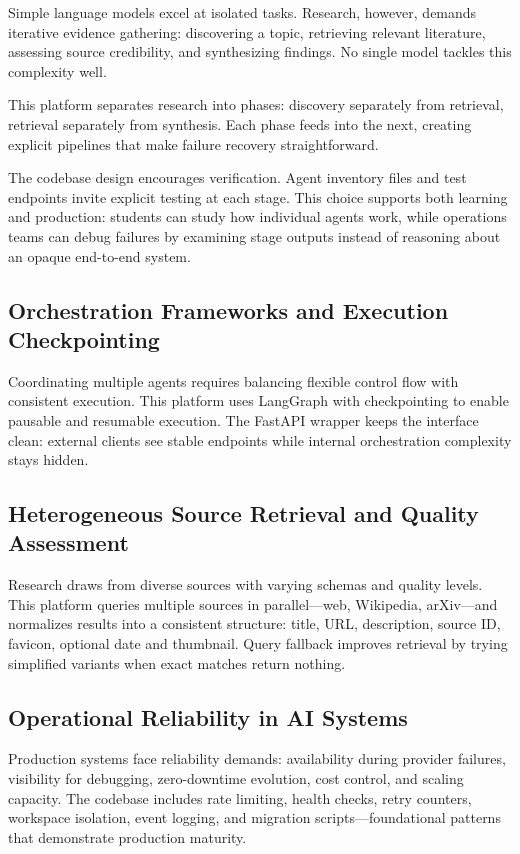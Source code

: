 \documentclass[12pt, a4paper]{article}
\begin{document}
Simple language models excel at isolated tasks. Research, however, demands iterative evidence gathering: discovering a topic, retrieving relevant literature, assessing source credibility, and synthesizing findings. No single model tackles this complexity well.

This platform separates research into phases: discovery separately from retrieval, retrieval separately from synthesis. Each phase feeds into the next, creating explicit pipelines that make failure recovery straightforward.

The codebase design encourages verification. Agent inventory files and test endpoints invite explicit testing at each stage. This choice supports both learning and production: students can study how individual agents work, while operations teams can debug failures by examining stage outputs instead of reasoning about an opaque end-to-end system.

\subsection{Orchestration Frameworks and Execution Checkpointing}

Coordinating multiple agents requires balancing flexible control flow with consistent execution. This platform uses LangGraph with checkpointing to enable pausable and resumable execution. The FastAPI wrapper keeps the interface clean: external clients see stable endpoints while internal orchestration complexity stays hidden.

\subsection{Heterogeneous Source Retrieval and Quality Assessment}

Research draws from diverse sources with varying schemas and quality levels. This platform queries multiple sources in parallel—web, Wikipedia, arXiv—and normalizes results into a consistent structure: title, URL, description, source ID, favicon, optional date and thumbnail. Query fallback improves retrieval by trying simplified variants when exact matches return nothing.

\subsection{Operational Reliability in AI Systems}

Production systems face reliability demands: availability during provider failures, visibility for debugging, zero-downtime evolution, cost control, and scaling capacity. The codebase includes rate limiting, health checks, retry counters, workspace isolation, event logging, and migration scripts—foundational patterns that demonstrate production maturity.
\end{document}

